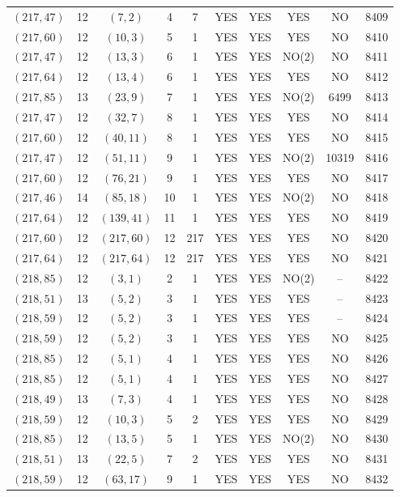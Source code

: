 \begin{longtable}{|c|c|c|c|c|c|c|c|c|c|}
$(217, 47)$ & 12 & $(7, 2)$ & 4 & 7 & YES & YES & YES & NO & 8409\\
$(217, 60)$ & 12 & $(10, 3)$ & 5 & 1 & YES & YES & YES & NO & 8410\\
$(217, 47)$ & 12 & $(13, 3)$ & 6 & 1 & YES & YES & NO(2) & NO & 8411\\
$(217, 64)$ & 12 & $(13, 4)$ & 6 & 1 & YES & YES & YES & NO & 8412\\
$(217, 85)$ & 13 & $(23, 9)$ & 7 & 1 & YES & YES & NO(2) & 6499 & 8413\\
$(217, 47)$ & 12 & $(32, 7)$ & 8 & 1 & YES & YES & YES & NO & 8414\\
$(217, 60)$ & 12 & $(40, 11)$ & 8 & 1 & YES & YES & YES & NO & 8415\\
$(217, 47)$ & 12 & $(51, 11)$ & 9 & 1 & YES & YES & NO(2) & 10319 & 8416\\
$(217, 60)$ & 12 & $(76, 21)$ & 9 & 1 & YES & YES & YES & NO & 8417\\
$(217, 46)$ & 14 & $(85, 18)$ & 10 & 1 & YES & YES & NO(2) & NO & 8418\\
$(217, 64)$ & 12 & $(139, 41)$ & 11 & 1 & YES & YES & YES & NO & 8419\\
$(217, 60)$ & 12 & $(217, 60)$ & 12 & 217 & YES & YES & YES & NO & 8420\\
$(217, 64)$ & 12 & $(217, 64)$ & 12 & 217 & YES & YES & YES & NO & 8421\\
$(218, 85)$ & 12 & $(3, 1)$ & 2 & 1 & YES & YES & NO(2) & -- & 8422\\
$(218, 51)$ & 13 & $(5, 2)$ & 3 & 1 & YES & YES & YES & -- & 8423\\
$(218, 59)$ & 12 & $(5, 2)$ & 3 & 1 & YES & YES & YES & -- & 8424\\
$(218, 59)$ & 12 & $(5, 2)$ & 3 & 1 & YES & YES & YES & NO & 8425\\
$(218, 85)$ & 12 & $(5, 1)$ & 4 & 1 & YES & YES & YES & NO & 8426\\
$(218, 85)$ & 12 & $(5, 1)$ & 4 & 1 & YES & YES & YES & NO & 8427\\
$(218, 49)$ & 13 & $(7, 3)$ & 4 & 1 & YES & YES & YES & NO & 8428\\
$(218, 59)$ & 12 & $(10, 3)$ & 5 & 2 & YES & YES & YES & NO & 8429\\
$(218, 85)$ & 12 & $(13, 5)$ & 5 & 1 & YES & YES & NO(2) & NO & 8430\\
$(218, 51)$ & 13 & $(22, 5)$ & 7 & 2 & YES & YES & YES & NO & 8431\\
$(218, 59)$ & 12 & $(63, 17)$ & 9 & 1 & YES & YES & YES & NO & 8432\\

\end{longtable}
